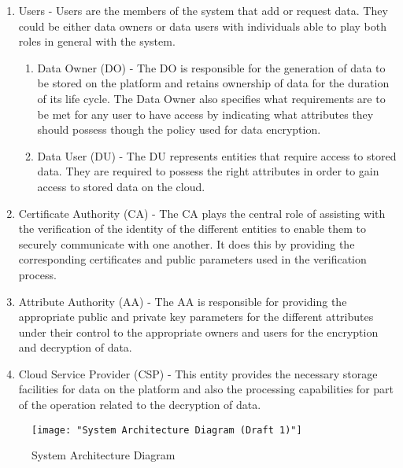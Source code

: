 \begin{enumerate}[label=(\arabic*)]
	\item Users - Users are the members of the system that add or request data. They could be either data owners or data users with individuals able to play both roles in general with the system.
	
	\begin{enumerate}
		\item Data Owner (DO) - The DO is responsible for the generation of data to be stored on the platform and retains ownership of data for the duration of its life cycle. The Data Owner also specifies what requirements are to be met for any user to have access by indicating what attributes they should possess though the policy used for data encryption.
		
		\item Data User (DU) - The DU represents entities that require access to stored data. They are required to possess the right attributes in order to gain access to stored data on the cloud.
	\end{enumerate}
	
	\item Certificate Authority (CA) - The CA plays the central role of assisting with the verification of the identity of the different entities to enable them to securely communicate with one another. It does this by providing the corresponding certificates and public parameters used in the verification process.
	
	\item Attribute Authority (AA) - The AA is responsible for providing the appropriate public and private key parameters for the different attributes under their control to the appropriate owners and users for the encryption and decryption of data. 
	
	\item Cloud Service Provider (CSP) - This entity provides the necessary storage facilities for data on the platform and also the processing capabilities for part of the operation related to the decryption of data.
	
\end{enumerate}

\begin{figure}[h]
	\centering
	\texttt{[image: "System Architecture Diagram (Draft 1)"]}
	\caption{System Architecture Diagram}
	\label{fig:sysarch}
\end{figure}

